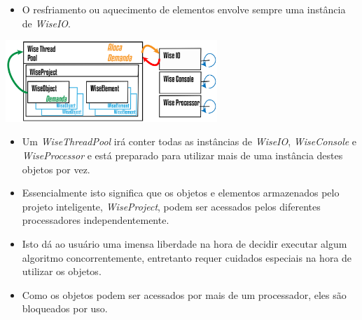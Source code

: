 \documentclass[10pt,aspectratio=169]{beamer}
\theoremstyle{remark}
\theoremstyle{definition}
\begin{document}
\begin{frame}[allowframebreaks]
		\framebreak
		
		\begin{itemize}
				\item O resfriamento ou aquecimento de elementos envolve sempre uma instância de \textit{WiseIO}.
		\end{itemize}		
		
		\begin{center}
			
			\item \includegraphics[width=0.6\textwidth]{Figures/WiseThreadPoolHeating@16x.png}
			
		\end{center}
		
		\framebreak
		
		\begin{itemize}
			\item Um \textit{WiseThreadPool} irá conter todas as instâncias de \textit{WiseIO}, \textit{WiseConsole} e \textit{WiseProcessor} e está preparado para utilizar mais de uma instância destes objetos por vez.
			\item Essencialmente isto significa que os objetos e elementos armazenados pelo projeto inteligente, \textit{WiseProject}, podem ser acessados pelos diferentes processadores independentemente.
			
			\item Isto dá ao usuário uma imensa liberdade na hora de decidir executar algum algoritmo concorrentemente, entretanto requer cuidados especiais na hora de utilizar os objetos.
			
			\item Como os objetos podem ser acessados por mais de um processador, eles são bloqueados por uso.
		\end{itemize}
	


		\end{frame}
		
		
\end{document}
